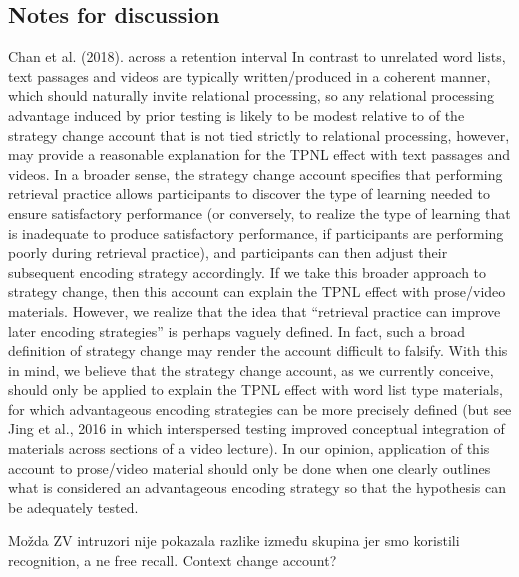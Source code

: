 \documentclass[../main.tex]{subfiles}
\begin{document}
\subsection{Notes for discussion}


Chan et al. (2018). across a retention interval
In contrast to unrelated word lists, text passages and videos are
typically written/produced in a coherent manner, which should naturally
invite relational processing, so any relational processing advantage
induced by prior testing is likely to be modest relative to
of the strategy change account that is not tied strictly to relational
processing, however, may provide a reasonable explanation for the
TPNL effect with text passages and videos. In a broader sense, the
strategy change account specifies that performing retrieval practice
allows participants to discover the type of learning needed to ensure
satisfactory performance (or conversely, to realize the type of learning
that is inadequate to produce satisfactory performance, if participants
are performing poorly during retrieval practice), and participants can
then adjust their subsequent encoding strategy accordingly. If we take
this broader approach to strategy change, then this account can explain
the TPNL effect with prose/video materials. However, we realize that
the idea that “retrieval practice can improve later encoding strategies”
is perhaps vaguely defined. In fact, such a broad definition of strategy
change may render the account difficult to falsify. With this in mind, we
believe that the strategy change account, as we currently conceive,
should only be applied to explain the TPNL effect with word list type
materials, for which advantageous encoding strategies can be more
precisely defined (but see Jing et al., 2016 in which interspersed testing
improved conceptual integration of materials across sections of a video
lecture). In our opinion, application of this account to prose/video
material should only be done when one clearly outlines what is considered
an advantageous encoding strategy so that the hypothesis can
be adequately tested.


Možda ZV intruzori nije pokazala razlike između skupina jer smo koristili 
recognition, a ne free recall.
Context change account?
\end{document}

